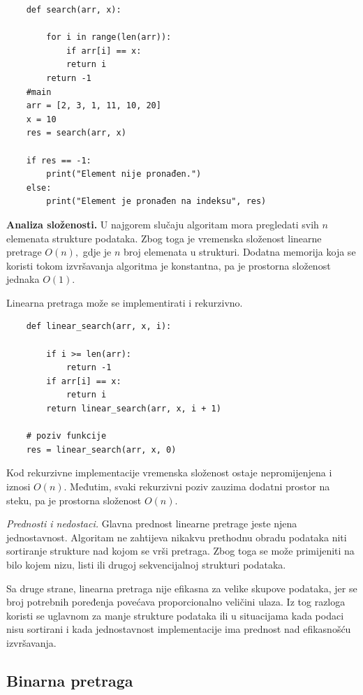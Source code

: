 \begin{verbatim}
	def search(arr, x):
	
	    for i in range(len(arr)):
	        if arr[i] == x:
	        return i
	    return -1
	#main
	arr = [2, 3, 1, 11, 10, 20]
	x = 10
	res = search(arr, x)
	
	if res == -1:
	    print("Element nije pronađen.")
	else:
	    print("Element je pronađen na indeksu", res)
\end{verbatim}

\textbf{Analiza složenosti.} U najgorem slučaju algoritam mora pregledati svih $n$ elemenata strukture podataka. Zbog toga je vremenska složenost linearne pretrage $O(n),$  gdje je $n$ broj elemenata u strukturi. Dodatna memorija koja se koristi tokom izvršavanja algoritma je konstantna, pa je prostorna složenost jednaka $O(1).$

\vspace{0.3cm}

Linearna pretraga može se implementirati i rekurzivno.

\begin{verbatim}
	def linear_search(arr, x, i):
	
	    if i >= len(arr):
	        return -1
	    if arr[i] == x:
	        return i	
	    return linear_search(arr, x, i + 1)

	# poziv funkcije
	res = linear_search(arr, x, 0)
\end{verbatim}

Kod rekurzivne implementacije vremenska složenost ostaje nepromijenjena i iznosi $O(n)$. Međutim, svaki rekurzivni poziv zauzima dodatni prostor na steku, pa je prostorna složenost $O(n).$

\textit{Prednosti i nedostaci.}  Glavna prednost linearne pretrage jeste njena jednostavnost. Algoritam ne zahtijeva nikakvu prethodnu obradu podataka niti sortiranje strukture nad kojom se vrši pretraga. Zbog toga se može primijeniti na bilo kojem nizu, listi ili drugoj sekvencijalnoj strukturi podataka.

Sa druge strane, linearna pretraga nije efikasna za velike skupove podataka, jer se broj potrebnih poređenja povećava proporcionalno veličini ulaza. Iz tog razloga koristi se uglavnom za manje strukture podataka ili u situacijama kada podaci nisu sortirani i kada jednostavnost implementacije ima prednost nad efikasnošću izvršavanja.

\subsection{Binarna pretraga}

